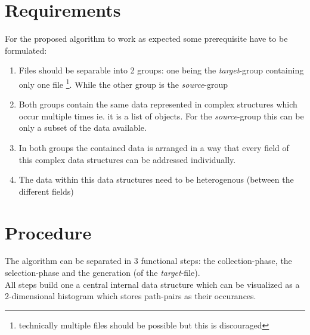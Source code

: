 \documentclass[conference]{IEEEtran}
\begin{document}
\section{Requirements}
For the proposed algorithm to work as expected some prerequisite have to be formulated:
\begin{enumerate}[label=(\roman*)]
 \item Files should be separable into 2 groups: one being the \textit{target}-group containing
        only one file \footnote{technically multiple files should be possible but this is
        discouraged}. While the other group is the \textit{source}-group
 \item Both groups contain the same data represented in complex structures which occur multiple
        times ie. it is a list of objects. For the \textit{source}-group this can be only a
        subset of the data available.
 \item In both groups the contained data is arranged in a way that every field of this complex
        data structures can be addressed individually.
 \item The data within this data structures need to be heterogenous (between the different
        fields)
\end{enumerate}

\section{Procedure}
The algorithm can be separated in 3 functional steps: the collection-phase, the selection-phase
and the generation (of the \textit{target}-file).\\All steps build one a central internal data
structure which can be visualized as a 2-dimensional histogram which stores path-pairs as their
occurances.
\end{document}
